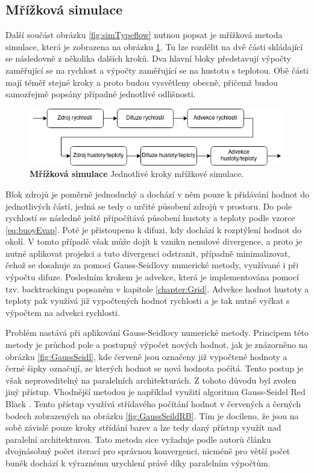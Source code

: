 \subsection{Mřížková simulace}
\label{chapter:simGrid}
Další součást obrázku \ref{fig:simTypeflow} nutnou popsat je mřížková metoda simulace, která je zobrazena na obrázku \ref{fig:Gridflow}. Tu lze rozdělit na dvě části skládající se následovně z několika dalších kroků. Dva hlavní bloky představují výpočty zaměřující se na rychlost a výpočty zaměřující se na hustotu s teplotou. Obě části mají téměř stejné kroky a proto budou vysvětleny obecně, přičemž budou samozřejmě popsány případné jednotlivé odlišnosti.

\begin{figure}[hbt]
	\centering
	\captionsetup{justification=centering}
	\includegraphics[scale=0.6]{obrazky-figures/GridFluid.png}
	\caption{\textbf{Mřížková simulace} Jednotlivé kroky mřížkové simulace.}
	\label{fig:Gridflow}
\end{figure}

Blok zdrojů je poměrně jednoduchý a dochází v něm pouze k přidávání hodnot do jednotlivých částí, jedná se tedy o určité působení zdrojů v prostoru. Do pole rychlostí se následně ještě připočítává působení hustoty a teploty podle vzorce \ref{eq:buoyEvap}. Poté je přistoupeno k difuzi, kdy dochází k rozptýlení hodnot do okolí. V tomto případě však může dojít k vzniku nenulové divergence, a proto je nutné aplikovat projekci a tuto divergenci odstranit, případně minimalizovat, čehož se dosahuje za pomocí Gauss-Seidlovy numerické metody, využívané i při výpočtu difuze. Posledním krokem je advekce, která je implementována pomocí tzv. backtrackingu popsaném v kapitole \ref{chapter:Grid}. Advekce hodnot hustoty a teploty pak využívá již vypočtených hodnot rychlosti a je tak nutné vyčkat s výpočtem na advekci rychlosti.

Problém nastává při aplikování Gauss-Seidlovy numerické metody. Principem této metody je průchod pole a postupný výpočet nových hodnot, jak je znázorněno na obrázku \ref{fig:GaussSeidl}, kde červeně jsou označeny již vypočtené hodnoty a černé šipky označují, ze kterých hodnot se nová hodnota počítá. Tento postup je však neproveditelný na paralelních architekturách. Z tohoto důvodu byl zvolen jiný přístup. Vhodnější metodou je například využití algoritmu Gauss-Seidel Red Black \cite{Amador2012LinearSF}. Tento přístup využívá střídavého počítání hodnot v červených a černých bodech zobrazených na obrázku \ref{fig:GaussSeildRB}. Tím je docíleno, že jsou na sobě závislé pouze kroky střídání barev a lze tedy daný přístup využít nad paralelní architekturou. Tato metoda sice vyžaduje podle autorů článku \cite{Amador2012LinearSF} dvojnásobný počet iterací pro správnou konvergenci, nicméně pro větší počet buněk dochází k výraznému urychlení právě díky paralelním výpočtům.

